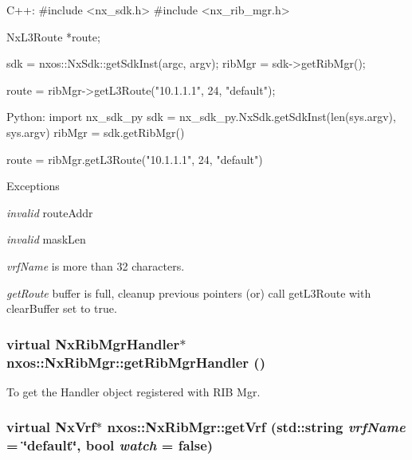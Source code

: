 \begin{DoxyCode}
  C++:
       #include <nx_sdk.h>
       #include <nx_rib_mgr.h>

       NxL3Route    *route;

       sdk = nxos::NxSdk::getSdkInst(argc, argv);
       ribMgr = sdk->getRibMgr();

       route = ribMgr->getL3Route("10.1.1.1", 24, "default");

  Python:
       import nx_sdk_py
       sdk = nx_sdk_py.NxSdk.getSdkInst(len(sys.argv), sys.argv)
       ribMgr = sdk.getRibMgr()

       route = ribMgr.getL3Route("10.1.1.1", 24, "default")
\end{DoxyCode}



\begin{DoxyExceptions}{Exceptions}
\item[{\em invalid}]routeAddr \item[{\em invalid}]maskLen \item[{\em vrfName}]is more than 32 characters. \item[{\em getRoute}]buffer is full, cleanup previous pointers (or) call getL3Route with clearBuffer set to true. \end{DoxyExceptions}
\hypertarget{classnxos_1_1NxRibMgr_aeed917ba912782303662c4009f3fcfcd}{
\subsubsection[{getRibMgrHandler}]{\setlength{\rightskip}{0pt plus 5cm}virtual {\bf NxRibMgrHandler}$\ast$ nxos::NxRibMgr::getRibMgrHandler ()}}
\label{classnxos_1_1NxRibMgr_aeed917ba912782303662c4009f3fcfcd}
To get the Handler object registered with RIB Mgr. \hypertarget{classnxos_1_1NxRibMgr_a605323f1d764bc8c27fe770a9a6b4628}{
\subsubsection[{getVrf}]{\setlength{\rightskip}{0pt plus 5cm}virtual {\bf NxVrf}$\ast$ nxos::NxRibMgr::getVrf (std::string {\em vrfName} = {\ttfamily \char`\"{}default\char`\"{}}, \/  bool {\em watch} = {\ttfamily false})}}
